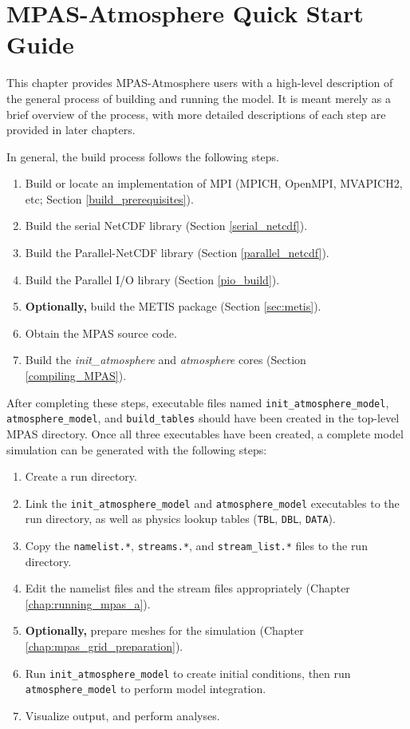 \chapter{MPAS-Atmosphere Quick Start Guide}
\label{chap:quick_start}

This chapter provides MPAS-Atmosphere users with a high-level description of
the general process of building and running the model. It is meant merely as a brief overview of the
process, with more detailed descriptions of each step are provided in later
chapters.

In general, the build process follows the following steps.

\begin{enumerate}
	\item Build or locate an implementation of MPI (MPICH, OpenMPI, MVAPICH2, etc; Section \ref{build_prerequisites}).
	\item Build the serial NetCDF library (Section \ref{serial_netcdf}).
	\item Build the Parallel-NetCDF library (Section \ref{parallel_netcdf}).
	\item Build the Parallel I/O library (Section \ref{pio_build}).
	\item {\bf Optionally,} build the METIS package (Section \ref{sec:metis}).
	\item Obtain the MPAS source code.
	\item Build the {\em init\_atmosphere} and {\em atmosphere} cores (Section \ref{compiling_MPAS}).
\end{enumerate}

After completing these steps, executable files named {\tt init\_atmosphere\_model}, 
{\tt atmosphere\_model}, and {\tt build\_tables} should have been created in the top-level MPAS directory. Once
all three executables have been created, a complete model simulation can be generated with the following steps:

\begin{enumerate}
	\item Create a run directory.
	\item Link the {\tt init\_atmosphere\_model} and {\tt atmosphere\_model} executables to the run directory, as well as physics lookup tables ({\tt *TBL}, {\tt *DBL}, {\tt *DATA}).
	\item Copy the {\tt namelist.*}, {\tt streams.*}, and {\tt stream\_list.*} files to the run directory. 
	\item Edit the namelist files and the stream files appropriately (Chapter \ref{chap:running_mpas_a}).
	\item {\bf Optionally,} prepare meshes for the simulation (Chapter \ref{chap:mpas_grid_preparation}).
	\item Run {\tt init\_atmosphere\_model} to create initial conditions, then run {\tt atmosphere\_model} to perform model integration.
	\item Visualize output, and perform analyses.
\end{enumerate}
